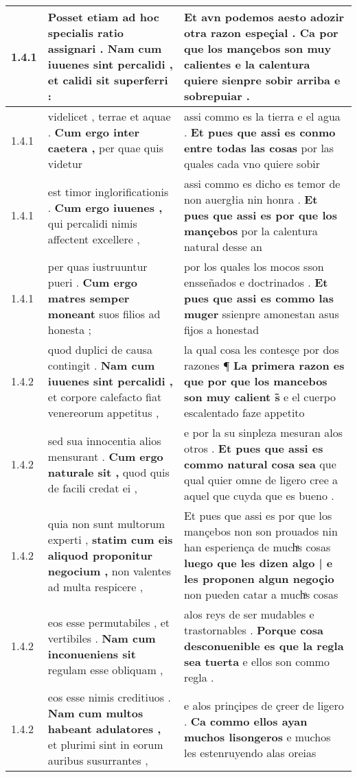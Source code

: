 \begin{tabular}{|p{1cm}|p{6.5cm}|p{6.5cm}|}
1.4.1 & Posset etiam ad hoc specialis ratio assignari . \textbf{ Nam cum iuuenes sint percalidi , } et calidi sit superferri : & Et avn podemos aesto adozir otra razon espeçial . \textbf{ Ca por que los mançebos son muy calientes } e la calentura quiere sienpre sobir arriba e sobrepuiar . \\\hline
1.4.1 & videlicet , terrae et aquae . \textbf{ Cum ergo inter caetera , } per quae quis videtur & assi commo es la tierra e el agua . \textbf{ Et pues que assi es conmo entre todas las cosas } por las quales cada vno quiere sobir \\\hline
1.4.1 & est timor inglorificationis . \textbf{ Cum ergo iuuenes , } qui percalidi nimis affectent excellere , & assi commo es dicho es temor de non auergłia nin honra . \textbf{ Et pues que assi es por que los mançebos } por la calentura natural desse an \\\hline
1.4.1 & per quas iustruuntur pueri . \textbf{ Cum ergo matres semper moneant } suos filios ad honesta ; & por los quales los mocos sson ensseñados e doctrinados . \textbf{ Et pues que assi es commo las muger } ssienpre amonestan asus fijos a honestad \\\hline
1.4.2 & quod duplici de causa contingit . \textbf{ Nam cum iuuenes sint percalidi , } et corpore calefacto fiat venereorum appetitus , & la qual cosa les contesçe por dos razones ¶ \textbf{ La primera razon es que por que los mancebos son muy calient s̃ } e el cuerpo escalentado faze appetito \\\hline
1.4.2 & sed sua innocentia alios mensurant . \textbf{ Cum ergo naturale sit , } quod quis de facili credat ei , & e por la su sinpleza mesuran alos otros . \textbf{ Et pues que assi es commo natural cosa sea } que qual quier omne de ligero cree a aquel que cuyda que es bueno . \\\hline
1.4.2 & quia non sunt multorum experti , \textbf{ statim cum eis aliquod proponitur negocium , } non valentes ad multa respicere , & Et pues que assi es por que los mançebos non son prouados nin han esperiença de muchͣs cosas \textbf{ luego que les dizen algo | e les proponen algun negoçio } non pueden catar a muchͣs cosas \\\hline
1.4.2 & eos esse permutabiles , et vertibiles . \textbf{ Nam cum inconueniens sit } regulam esse obliquam , & alos reys de ser mudables e trastornables . \textbf{ Porque cosa desconuenible es que la regla sea tuerta } e ellos son commo regla . \\\hline
1.4.2 & eos esse nimis creditiuos . \textbf{ Nam cum multos habeant adulatores , } et plurimi sint in eorum auribus susurrantes , & e alos prinçipes de çreer de ligero . \textbf{ Ca commo ellos ayan muchos lisongeros } e muchos les estenruyendo alas oreias \\\hline

\end{tabular}
